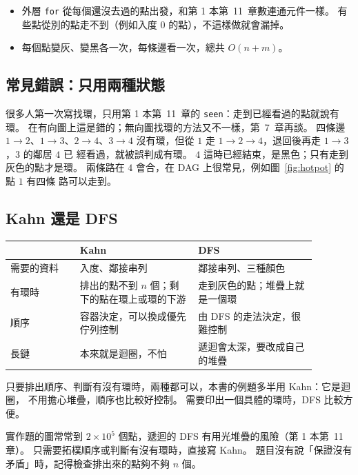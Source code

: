 \begin{itemize}
\item 外層 \texttt{for} 從每個還沒去過的點出發，和第 1 本第~11~章數連通元件一樣。 有
些點從別的點走不到（例如入度 $0$ 的點），不這樣做就會漏掉。
\item 每個點變灰、變黑各一次，每條邊看一次，總共 $O(n + m)$。
\end{itemize}

\subsection{常見錯誤：只用兩種狀態}

很多人第一次寫找環，只用第 1 本第~11~章的 \texttt{seen}：走到已經看過的點就說有環。
在有向圖上這是錯的；無向圖找環的方法又不一樣，第~7~章再談。 四條邊 $1 \to 2$、$1 \to 3$、$2 \to 4$、$3 \to 4$
沒有環，但從 $1$ 走 $1 \to 2 \to 4$，退回後再走 $1 \to 3$，$3$ 的鄰居 $4$ 已
經看過，就被誤判成有環。 $4$ 這時已經結束，是黑色；只有走到灰色的點才是環。
兩條路在 $4$ 會合，在 DAG 上很常見，例如圖~\ref{fig:hotpot} 的點 $1$ 有四條
路可以走到。

\subsection{Kahn 還是 DFS}

\begin{center}
\begin{tabular}{p{0.2\linewidth}p{0.34\linewidth}p{0.34\linewidth}}
\toprule
 & Kahn & DFS \\
\midrule
需要的資料 & 入度、鄰接串列 & 鄰接串列、三種顏色 \\
有環時 & 排出的點不到 $n$ 個；剩下的點在環上或環的下游 & 走到灰色的點；堆疊上就是一個環 \\
順序 & 容器決定，可以換成優先佇列控制 & 由 DFS 的走法決定，很難控制 \\
長鏈 & 本來就是迴圈，不怕 & 遞迴會太深，要改成自己的堆疊 \\
\bottomrule
\end{tabular}
\end{center}

只要排出順序、判斷有沒有環時，兩種都可以，本書的例題多半用 Kahn：它是迴圈，
不用擔心堆疊，順序也比較好控制。 需要印出一個具體的環時，DFS 比較方便。

\begin{apcsnote}
實作題的圖常常到 $2 \times 10^5$ 個點，遞迴的 DFS 有用光堆疊的風險（第 1 本第~11~
章）。 只需要拓樸順序或判斷有沒有環時，直接寫 Kahn。 題目沒有說「保證沒有
矛盾」時，記得檢查排出來的點夠不夠 $n$ 個。
\end{apcsnote}

